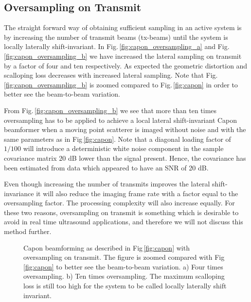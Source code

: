 \documentclass[journal]{IEEEtran}
\newcommand{\img}{img/}
\begin{document}
\subsection{Oversampling on Transmit}
The straight forward way of obtaining sufficient sampling in an active system is by increasing the number of transmit beams (tx-beams) until the system is locally laterally shift-invariant. In Fig.\,\ref{fig:capon_oversampling_a} and Fig.\,\ref{fig:capon_oversampling_b} we have increased the lateral sampling on transmit by a factor of four and ten respectively. As expected the geometric distortion and scalloping loss decreases with increased lateral sampling. Note that Fig.\,\ref{fig:capon_oversampling_b} is zoomed compared to Fig.\,\ref{fig:capon} in order to better see the beam-to-beam variation.

From Fig.\,\ref{fig:capon_oversampling_b} we see that more than ten times oversampling has to be applied to achieve a local lateral shift-invariant Capon beamformer when a moving point scatterer is imaged without noise and with the same parameters as in Fig\,\ref{fig:capon}. %
Note that a diagonal loading factor of $1/100$ will introduce a deterministic white noise component in the sample covariance matrix $20$ dB lower than the signal present. Hence, the covariance has been estimated from data which appeared to have an SNR of 20 dB.

Even though increasing the number of transmits improves the lateral shift-invariance it will also reduce the imaging frame rate with a factor equal to the oversampling factor. The processing complexity will also increase equally. For these two reasons, oversampling on transmit is something which is desirable to avoid in real time ultrasound applications, and therefore we will not discuss this method further.

\begin{figure}[!t]
\centerline{
}
\caption{Capon beamforming as described in Fig\,\ref{fig:capon} with oversampling on transmit. The figure is zoomed compared with Fig\,\ref{fig:capon} to better see the beam-to-beam variation. a) Four times oversampling. b) Ten times oversampling. The maximum scalloping loss is still too high for the system to be called locally laterally shift invariant.}
\label{fig:capon_oversampling}
\end{figure}
\end{document}
